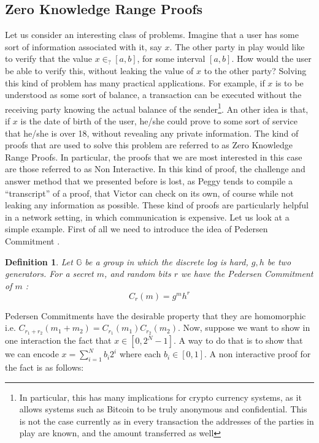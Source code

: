 \documentclass{article}
\newtheorem{definition}{Definition}
\begin{document}
\subsection{Zero Knowledge Range Proofs}
\label{zkrp}
Let us consider an interesting class of problems. Imagine that a user has some sort of information associated
with it, say $x$. The other party in play would like to verify that the value $x \in_? [a, b]$, for some
interval $[a, b]$. How would the user be able to verify this, without leaking the value of $x$ to the
other party? Solving this kind of problem has many practical applications. For example, if $x$ is to be
understood as some sort of balance, a transaction can be executed without the receiving party knowing the
actual balance of the sender\footnote{In particular, this has many implications for crypto currency systems,
    as it allows systems such as Bitcoin to be truly anonymous and confidential. This is not the case currently
    as in every transaction the addresses of the parties in play are known, and the amount transferred as well}.
An other idea is that, if $x$ is the date of birth of the user, he/she could
prove to some sort of service that he/she is over 18, without revealing any private information. The kind
of proofs that are used to solve this problem are referred to as Zero Knowledge Range Proofs. In particular,
the proofs that we are most interested in this case are those referred to as Non Interactive. In this kind
of proof, the challenge and answer method that we presented before is lost, as Peggy tends to
compile a \enquote{transcript} of a proof, that Victor can check on its own, of course while not leaking any information
as possible. These kind of proofs are particularly helpful in a network setting, in which communication is
expensive. Let us look at a simple example. First of all we need to introduce the idea of Pedersen Commitment \cite{pedersenNonInteractiveInformationTheoreticSecure1992}.
\begin{definition}
    Let $\mathbb{G}$ be a group in which the discrete log is hard, $g, h$ be two generators.
    For a secret $m$, and random bits $r$ we have the Pedersen Commitment of $m$ :
    \[ C_r(m) = g^m h^r \]
\end{definition}
Pedersen Commitments have the desirable property that they are homomorphic i.e. $C_{r_1 + r_2}(m_1 + m_2) = C_{r_1}(m_1) C_{r_2}(m_2)$.
Now, suppose we want to show in one interaction the fact that $x \in [0, 2^N -1]$. A way to do that is to show
that we can encode $x =\sum^N_{i=1} b_i 2^i$ where each $b_i \in [0, 1]$. A non interactive proof \cite{maoGuaranteedCorrectSharing1998b} for the fact is as follows:
\end{document}
